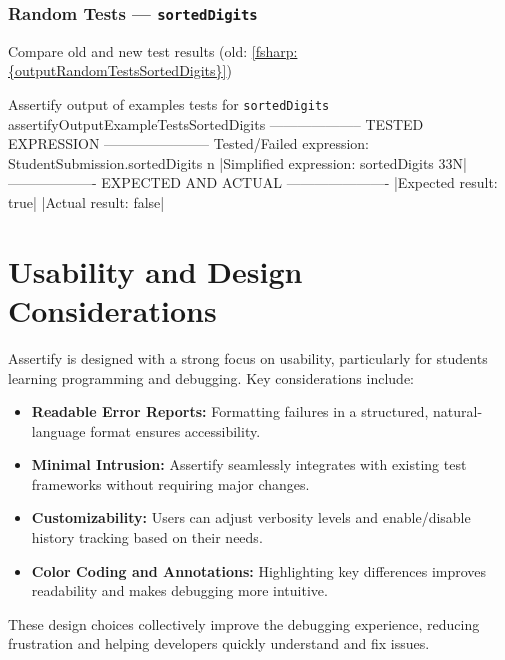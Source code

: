 \subsubsection{Random Tests --- \texttt{sortedDigits}} %


\begin{todolist}
    \item Compare old and new test results (old: \ref{fsharp:{outputRandomTestsSortedDigits}})
\end{todolist}


\begin{fsharpoutput}%
{Assertify output of examples tests for \texttt{sortedDigits}}%
{assertifyOutputExampleTestsSortedDigits}
-------------------- TESTED EXPRESSION -----------------------
Tested/Failed expression:   StudentSubmission.sortedDigits n
|{\color{blue}Simplified expression:      sortedDigits 33N}|
------------------- EXPECTED AND ACTUAL ----------------------
|{\color{green!70!black}Expected result:            true}|
|{\color{red}Actual result:              false}|
\end{fsharpoutput}
    

\section{Usability and Design Considerations} %



Assertify is designed with a strong focus on usability, particularly for students learning programming and debugging. Key considerations include:
\begin{itemize}
    \item \textbf{Readable Error Reports:} Formatting failures in a structured, natural-language format ensures accessibility.
    \item \textbf{Minimal Intrusion:} Assertify seamlessly integrates with existing test frameworks without requiring major changes.
    \item \textbf{Customizability:} Users can adjust verbosity levels and enable/disable history tracking based on their needs.
    \item \textbf{Color Coding and Annotations:} Highlighting key differences improves readability and makes debugging more intuitive.
\end{itemize}
These design choices collectively improve the debugging experience, reducing frustration and helping developers quickly understand and fix issues.


